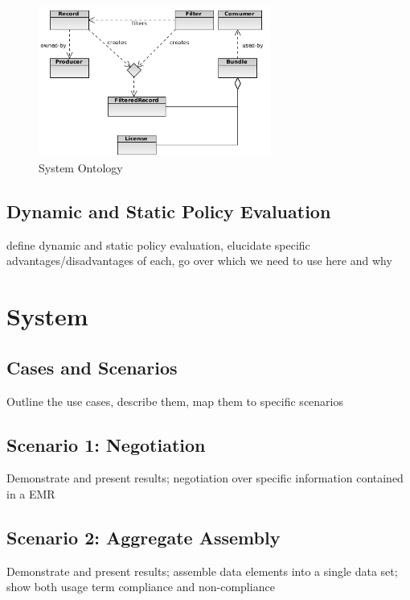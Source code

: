 \documentclass[10pt, conference, compsocconf]{IEEEtran}
\begin{document}
\begin{figure}[!t]
\centering
\includegraphics[width=3in]{ontology}
\caption{System Ontology}
\label{System Ontology}
\end{figure}

\subsection{Dynamic and Static Policy Evaluation}
define dynamic and static policy evaluation, elucidate specific advantages/disadvantages of each, go over which we need to use here and why

\section{System}

\subsection{Cases and Scenarios}
Outline the use cases, describe them, map them to specific scenarios

\subsection{Scenario 1: Negotiation}
Demonstrate and present results; negotiation over specific information contained in a EMR

\subsection{Scenario 2: Aggregate Assembly}
Demonstrate and present results; assemble data elements into a single data set; show both usage term compliance and non-compliance
\end{document}
